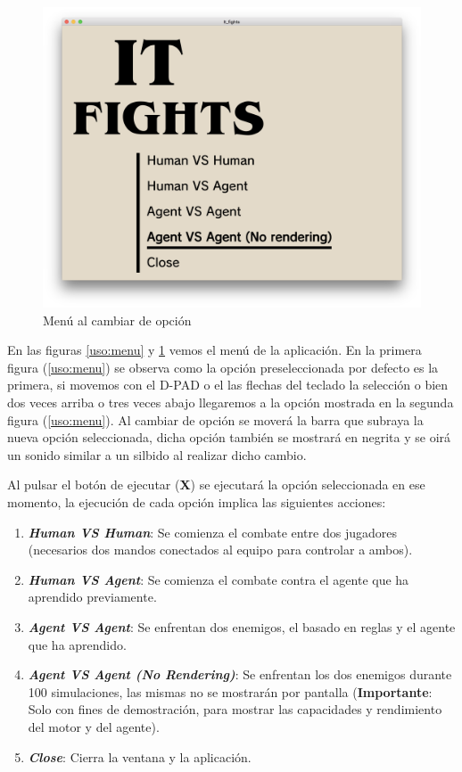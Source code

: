 \begin{figure}[h]
	\centerline{\includegraphics[width=17cm]{otros/manual/menu2.png}}
	\caption{Menú al cambiar de opción}
	\label{uso:menu2}
\end{figure}

En las figuras \ref{uso:menu} y \ref{uso:menu2} vemos el menú de la aplicación. En la primera figura (\ref{uso:menu}) se observa como la opción preseleccionada por defecto es la primera, si movemos con el D-PAD o el las flechas del teclado la selección o bien dos veces arriba o tres veces abajo llegaremos a la opción mostrada en la segunda figura (\ref{uso:menu}). Al cambiar de opción se moverá la barra que subraya la nueva opción seleccionada, dicha opción también se mostrará en negrita y se oirá un sonido similar a un silbido al realizar dicho cambio.

\bigskip

Al pulsar el botón de ejecutar (\textbf{X}) se ejecutará la opción seleccionada en ese momento, la ejecución de cada opción implica las siguientes acciones:

\begin{enumerate}
	\item \textbf{\textit{Human VS Human}}: Se comienza el combate entre dos jugadores (necesarios dos mandos conectados al equipo para controlar a ambos).
	\item \textbf{\textit{Human VS Agent}}: Se comienza el combate contra el agente que ha aprendido previamente.
	\item \textbf{\textit{Agent VS Agent}}: Se enfrentan dos enemigos, el basado en reglas y el agente que ha aprendido.
	\item \textbf{\textit{Agent VS Agent (No Rendering)}}: Se enfrentan los dos enemigos durante 100 simulaciones, las mismas no se mostrarán por pantalla (\textbf{Importante}: Solo con fines de demostración, para mostrar las capacidades y rendimiento del motor y del agente).
	\item \textbf{\textit{Close}}: Cierra la ventana y la aplicación.
\end{enumerate}

